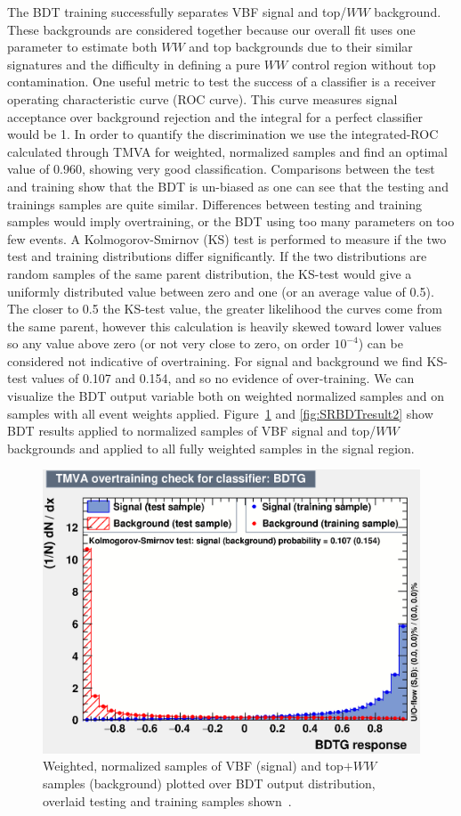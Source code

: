 The BDT training successfully separates VBF signal and top/$WW$ background. These backgrounds are considered together because our overall fit uses one parameter to estimate both $WW$ and top backgrounds due to their similar signatures and the difficulty in defining a pure $WW$ control region without top contamination. One useful metric to test the success of a classifier is a receiver operating characteristic curve (ROC curve). This curve measures signal acceptance over background rejection and the integral for a perfect classifier would be 1. In order to quantify the discrimination we use the integrated-ROC calculated through TMVA for weighted, normalized samples and find an optimal value of 0.960, showing very good classification. Comparisons between the test and training show that the BDT is un-biased as one can see that the testing and trainings samples are quite similar. Differences between testing and training samples would imply overtraining, or the BDT using too many parameters on too few events. A Kolmogorov-Smirnov (KS) test is performed to measure if the two test and training distributions differ significantly. If the two distributions are random samples of the same parent distribution, the KS-test would give a uniformly distributed value between zero and one (or an average value of 0.5). The closer to 0.5 the KS-test value, the greater likelihood the curves come from the same parent, however this calculation is heavily skewed toward lower values so any value above zero (or not very close to zero, on order $10^{-4}$) can be considered not indicative of overtraining. For signal and background we find KS-test values of 0.107 and 0.154, and so no evidence of over-training. We can visualize the BDT output variable both on weighted normalized samples and on samples with all event weights applied. Figure~\ref{fig:SRBDTresult} and \ref{fig:SRBDTresult2} show BDT results applied to normalized samples of VBF signal and top/$WW$ backgrounds and applied to all fully weighted samples in the signal region. 

\begin{figure}[!htbp]
\centering
  \includegraphics[width=.45\linewidth]{Pictures/VBFvsWW+Top/overtrain_BDTG.eps}
\caption{Weighted, normalized samples of VBF (signal) and top$+WW$ samples (background) plotted over BDT output distribution, overlaid testing and training samples shown~\cite{ourSupportNote}.}
\label{fig:SRBDTresult}
\end{figure}


